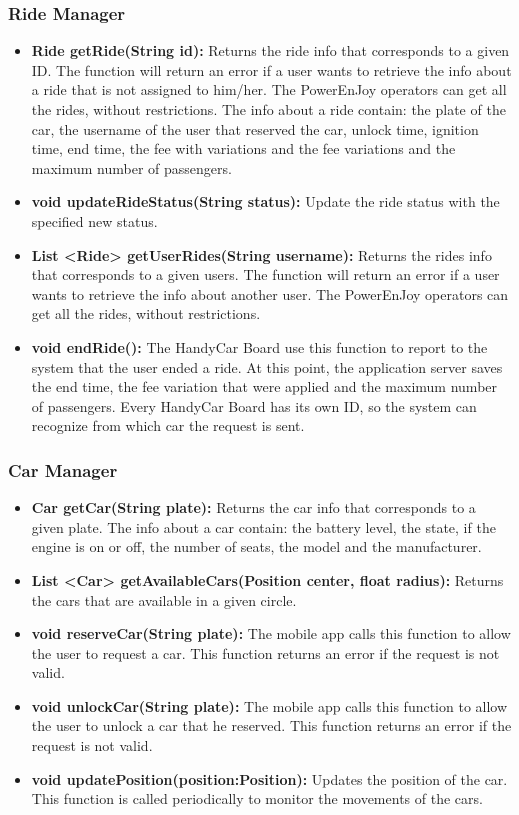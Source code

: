 \subsubsection{Ride Manager}
\begin{itemize}
	\item \textbf{Ride getRide(String id):} Returns the ride info that corresponds to a given ID. The function will return an error if a user wants to retrieve the info about a ride that is not assigned to him/her.
	The PowerEnJoy operators can get all the rides, without restrictions.
	The info about a ride contain: the plate of the car, the username of the user that reserved the car, unlock time, ignition time, end time, the fee with variations and the fee variations and the maximum number of passengers.
	\item \textbf{void updateRideStatus(String status):} Update the ride status with the specified new status.
	\item \textbf{List \textless Ride\textgreater{} getUserRides(String username):} Returns the rides info that corresponds to a given users. The function will return an error if a user wants to retrieve the info about another user.
	The PowerEnJoy operators can get all the rides, without restrictions.
	\item \textbf{void endRide():} The HandyCar Board use this function to report to the system that the user ended a ride. At this point, the application server saves the end time, the fee variation that were applied and the maximum number of passengers. Every HandyCar Board has its own ID, so the system can recognize from which car the request is sent.
\end{itemize}

\subsubsection{Car Manager}
\begin{itemize}
	\item \textbf{Car getCar(String plate):} Returns the car info that corresponds to a given plate.
	The info about a car contain: the battery level, the state, if the engine is on or off, the number of seats, the model and the manufacturer.
	\item \textbf{List \textless Car\textgreater{} getAvailableCars(Position center, float radius):} Returns the cars that are available in a given circle.
	\item \textbf{void reserveCar(String plate):} The mobile app calls this function to allow the user to request a car. This function returns an error if the request is not valid.
	\item \textbf{void unlockCar(String plate):} The mobile app calls this function to allow the user to unlock a car that he reserved. This function returns an error if the request is not valid.
	\item \textbf{void updatePosition(position:Position):} Updates the position of the car. This function is called periodically to monitor the movements of the cars.
\end{itemize}

